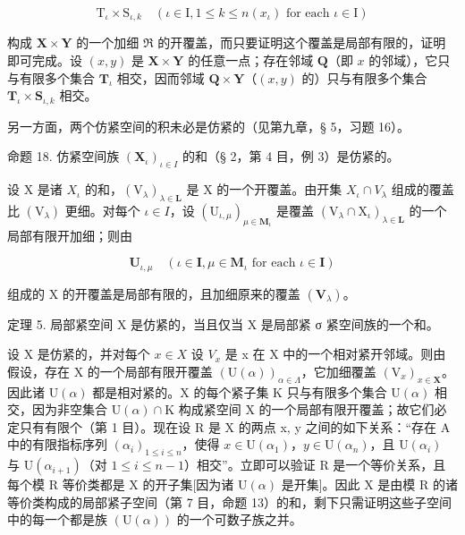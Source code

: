 \[
\mathrm{T} _ {\iota} \times \mathrm{S} _ {\iota, k} \quad (\iota \in \mathrm{I}, 1 \leqslant k \leqslant n (x _ {\iota}) \text {   for   each   } \iota \in \mathrm{I})
\]

构成 \(\mathbf{X} \times \mathbf{Y}\) 的一个加细 \(\Re\) 的开覆盖，而只要证明这个覆盖是局部有限的，证明即可完成。设 \((x, y)\) 是 \(\mathbf{X} \times \mathbf{Y}\) 的任意一点；存在邻域 \(\mathbf{Q}\)（即 \(x\) 的邻域），它只与有限多个集合 \(\mathbf{T}_{\iota}\) 相交，因而邻域 \(\mathbf{Q} \times \mathbf{Y}\)（\((x, y)\) 的）只与有限多个集合 \(\mathbf{T}_{\iota} \times \mathbf{S}_{\iota,k}\) 相交。

另一方面，两个仿紧空间的积未必是仿紧的（见第九章，§ 5，习题 16）。

命题 18. 仿紧空间族 \((\mathbf{X}_{\iota})_{\iota\in I}\) 的和（§ 2，第 4 目，例 3）是仿紧的。

设 X 是诸 \(X_{\iota}\) 的和，\((\mathrm{V}_{\lambda})_{\lambda\in\mathbf{L}}\) 是 X 的一个开覆盖。由开集 \(X_{\iota}\cap V_{\lambda}\) 组成的覆盖比 \((\mathrm{V}_{\lambda})\) 更细。对每个 \(\iota\in I\)，设 \((\mathrm{U}_{\iota,\mu})_{\mu\in\mathbf{M}_{\iota}}\) 是覆盖 \((\mathrm{V}_{\lambda}\cap\mathrm{X}_{\iota})_{\lambda\in\mathbf{L}}\) 的一个局部有限开加细；则由

\[
\mathbf {U} _ {\iota , \mu} \quad (\iota \in \mathbf {I}, \mu \in \mathbf {M} _ {\iota} \text {   for   each   } \iota \in \mathbf {I})
\]

组成的 X 的开覆盖是局部有限的，且加细原来的覆盖 \((\mathbf{V}_{\lambda})\)。

定理 5. 局部紧空间 X 是仿紧的，当且仅当 X 是局部紧 σ 紧空间族的一个和。

设 X 是仿紧的，并对每个 \(x \in X\) 设 \(V_x\) 是 x 在 X 中的一个相对紧开邻域。则由假设，存在 X 的一个局部有限开覆盖 \((\mathrm{U}(\alpha))_{\alpha \in \Lambda}\)，它加细覆盖 \((\mathrm{V}_x)_{x \in \mathbf{X}}\)。因此诸 \(\mathrm{U}(\alpha)\) 都是相对紧的。X 的每个紧子集 K 只与有限多个集合 \(\mathrm{U}(\alpha)\) 相交，因为非空集合 \(\mathrm{U}(\alpha) \cap \mathrm{K}\) 构成紧空间 X 的一个局部有限开覆盖；故它们必定只有有限个（第 1 目）。现在设 R 是 X 的两点 x, y 之间的如下关系：“存在 A 中的有限指标序列 \((\alpha_i)_{1 \leqslant i \leqslant n}\)，使得 \(x \in \mathrm{U}(\alpha_1)\)，\(y \in \mathrm{U}(\alpha_n)\)，且 \(\mathrm{U}(\alpha_i)\) 与 \(\mathrm{U}(\alpha_{i+1})\)（对 \(1 \leqslant i \leqslant n - 1\)）相交”。立即可以验证 R 是一个等价关系，且每个模 R 等价类都是 X 的开子集{[}因为诸 \(\mathrm{U}(\alpha)\) 是开集{]}。因此 X 是由模 R 的诸等价类构成的局部紧子空间（第 7 目，命题 13）的和，剩下只需证明这些子空间中的每一个都是族 \((\mathrm{U}(\alpha))\) 的一个可数子族之并。

